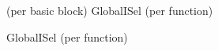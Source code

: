 \begin{frame}{}
  \begin{center}
  \end{center}
\end{frame}

\begin{frame}{}
  \begin{center}
     \quad {} (per basic block) \quad GlobalISel (per function)


    GlobalISel (per function)
  \end{center}
\end{frame}
